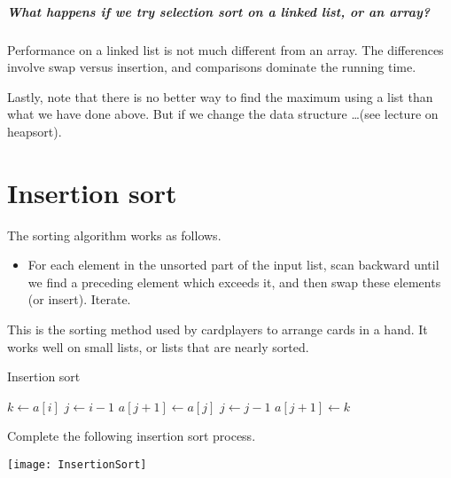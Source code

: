 \paragraph{What happens if we try selection sort on a linked list, or an array?}
Performance on a linked list is not much different from an array. 
The differences involve swap versus insertion, and comparisons dominate the running time.

Lastly, note that there is no better way to find the maximum using a list than what we have done above. 
But if we change the data structure \dots (see lecture on heapsort).



\chapter{Insertion sort} %
\label{sec:insertionsort}
The sorting algorithm  works as follows.
\begin{itemize}
	\item  For each element in the unsorted part of the input list, scan backward 
	until we find a preceding element which exceeds it, and then swap these 
	elements (or insert). Iterate.
\end{itemize}
This is the sorting method used by cardplayers to arrange cards in a hand.
It works well on small lists, or lists that are nearly sorted.

\begin{algorithm}[H]
  \caption{Insertion sort
    \label{alg:insort}}
\begin{algorithmic}[1]
\State $k \gets a[i]$ 
\State $j \gets i - 1$
\State {}
\State $a[j+1] \gets a[j]$
\State $j \gets j - 1$
\EndWhile
\State $a[j+1] \gets k$ 
\EndFor
\State {}
\EndFunction  
\end{algorithmic}
\end{algorithm}

\begin{Boxample}[0]
Complete the following insertion sort process.
\begin{center}
\texttt{[image: InsertionSort]}
\end{center}
\end{Boxample}

